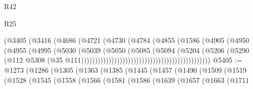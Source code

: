 \begin{lexlean}{R42}
\begin{lexlean}{R25}
\begin{coremodule}
{{{{{{{{{{{{{{{{{{{{{{{{{{{{{{{{{{{{{{{{{{{{{{{{{{{{{{{{{{{{{{{{{{{{{{{{{{{{{{{{{{{{{{{{{{{{{{{{{{{{{{{{{{{{{{{{{{{{{{{{{{{{{{{{{{{{{{{{{{{{{{{{{{{{{{{{{{{{{{{{{{{{{{{{{{{{{{{{{{{{{{{{{{{{{{{{{{{{{{{                                                      (@3405
                                                        (@3416
                                                          (@4686
                                                            (@4721
                                                              (@4730
                                                                (@4784
                                                                  (@4855
                                                                    (@1586
                                                                      (@4905
                                                                        (@4950
                                                                          (@4955
                                                                            (@4995
                                                                              (@5030
                                                                                (@5039
                                                                                  (@5050
                                                                                    (@5085
                                                                                      (@5094
                                                                                        (@5204
                                                                                          (@5206
                                                                                            (@5290
                                                                                              (@112
                                                                                                @5308
                                                                                                (@35
                                                                                                  @111)))))))))))))))))))))))))))))))))))))))))))))))
@5405 := @1273
    (@1286
      (@1305
        (@1363
          (@1385
            (@1445
              (@1457
                (@1490
                  (@1509
                    (@1519
                      (@1528
                        (@1545
                          (@1558
                            (@1566
                              (@1581
                                (@1586
                                  (@1639
                                    (@1657
                                      (@1663
                                        (@1711
}}}}}}}}}}}}}}}}}}}}}}}}}}}}}}}}}}}}}}}}}}}}}}}}}}}}}}}}}}}}}}}}}}}}}}}}}}}}}}}}}}}}}}}}}}}}}}}}}}}}}}}}}}}}}}}}}}}}}}}}}}}}}}}}}}}}}}}}}}}}}}}}}}}}}}}}}}}}}}}}}}}}}}}}}}}}}}}}}}}}}}}}}}}}}}}}}}}}}}}
\end{coremodule}
\end{lexlean}
\end{lexlean}
